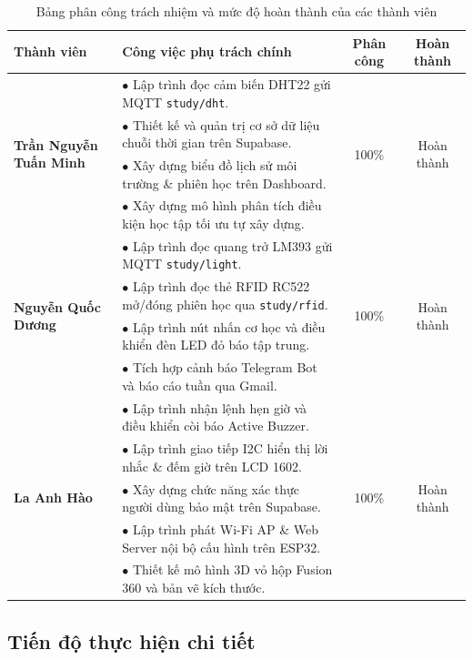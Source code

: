 \begin{table}[htbp]
\centering
\small
\begin{tabular}{|p{3.2cm}|p{7.5cm}|c|c|}
\hline
\textbf{Thành viên} & \textbf{Công việc phụ trách chính} & \textbf{Phân công} & \textbf{Hoàn thành} \\ \hline
\multirow{4}{=}{\textbf{Trần Nguyễn Tuấn Minh}} 
& $\bullet$ Lập trình đọc cảm biến DHT22 gửi MQTT \texttt{study/dht}. & \multirow{4}{*}{100\%} & \multirow{4}{*}{Hoàn thành} \\
& $\bullet$ Thiết kế và quản trị cơ sở dữ liệu chuỗi thời gian trên Supabase. & & \\
& $\bullet$ Xây dựng biểu đồ lịch sử môi trường \& phiên học trên Dashboard. & & \\
& $\bullet$ Xây dựng mô hình phân tích điều kiện học tập tối ưu tự xây dựng. & & \\ \hline

\multirow{4}{=}{\textbf{Nguyễn Quốc Dương}} 
& $\bullet$ Lập trình đọc quang trở LM393 gửi MQTT \texttt{study/light}. & \multirow{4}{*}{100\%} & \multirow{4}{*}{Hoàn thành} \\
& $\bullet$ Lập trình đọc thẻ RFID RC522 mở/đóng phiên học qua \texttt{study/rfid}. & & \\
& $\bullet$ Lập trình nút nhấn cơ học và điều khiển đèn LED đỏ báo tập trung. & & \\
& $\bullet$ Tích hợp cảnh báo Telegram Bot và báo cáo tuần qua Gmail. & & \\ \hline

\multirow{5}{=}{\textbf{La Anh Hào}} 
& $\bullet$ Lập trình nhận lệnh hẹn giờ và điều khiển còi báo Active Buzzer. & \multirow{5}{*}{100\%} & \multirow{5}{*}{Hoàn thành} \\
& $\bullet$ Lập trình giao tiếp I2C hiển thị lời nhắc \& đếm giờ trên LCD 1602. & & \\
& $\bullet$ Xây dựng chức năng xác thực người dùng bảo mật trên Supabase. & & \\
& $\bullet$ Lập trình phát Wi-Fi AP \& Web Server nội bộ cấu hình trên ESP32. & & \\
& $\bullet$ Thiết kế mô hình 3D vỏ hộp Fusion 360 và bản vẽ kích thước. & & \\ \hline
\end{tabular}
\caption{Bảng phân công trách nhiệm và mức độ hoàn thành của các thành viên}
\label{tab:phan_cong_cong_viec}
\end{table}

\subsection{Tiến độ thực hiện chi tiết}

